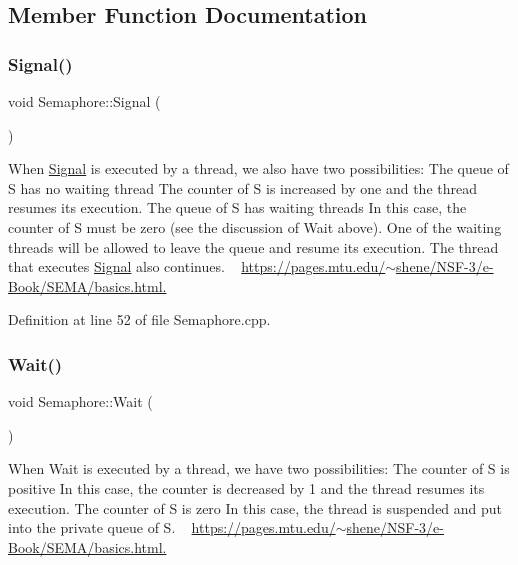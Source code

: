 \subsection{Member Function Documentation}
\mbox{\label{class_semaphore_a86f92f738b4486439b296d8e235895f2}} 
\subsubsection{\texorpdfstring{Signal()}{Signal()}}
{\footnotesize\ttfamily void Semaphore\+::\+Signal (\begin{DoxyParamCaption}{ }\end{DoxyParamCaption})}



When \hyperlink{class_signal}{Signal} is executed by a thread, we also have two possibilities\+: The queue of S has no waiting thread The counter of S is increased by one and the thread resumes its execution. The queue of S has waiting threads In this case, the counter of S must be zero (see the discussion of Wait above). One of the waiting threads will be allowed to leave the queue and resume its execution. The thread that executes \hyperlink{class_signal}{Signal} also continues. ~\newline
\hyperlink{}{https\+://pages.\+mtu.\+edu/$\sim$shene/\+N\+S\+F-\/3/e-\/\+Book/\+S\+E\+M\+A/basics.\+html.}



Definition at line 52 of file Semaphore.\+cpp.

\mbox{\label{class_semaphore_a72aabebf026e3a8b1f3e4d0fa8ee1eda}} 
\subsubsection{\texorpdfstring{Wait()}{Wait()}\hspace{0.1cm}{\footnotesize\ttfamily [1/2]}}
{\footnotesize\ttfamily void Semaphore\+::\+Wait (\begin{DoxyParamCaption}{ }\end{DoxyParamCaption})}



When Wait is executed by a thread, we have two possibilities\+: The counter of S is positive In this case, the counter is decreased by 1 and the thread resumes its execution. The counter of S is zero In this case, the thread is suspended and put into the private queue of S. ~\newline
\hyperlink{}{https\+://pages.\+mtu.\+edu/$\sim$shene/\+N\+S\+F-\/3/e-\/\+Book/\+S\+E\+M\+A/basics.\+html.}



